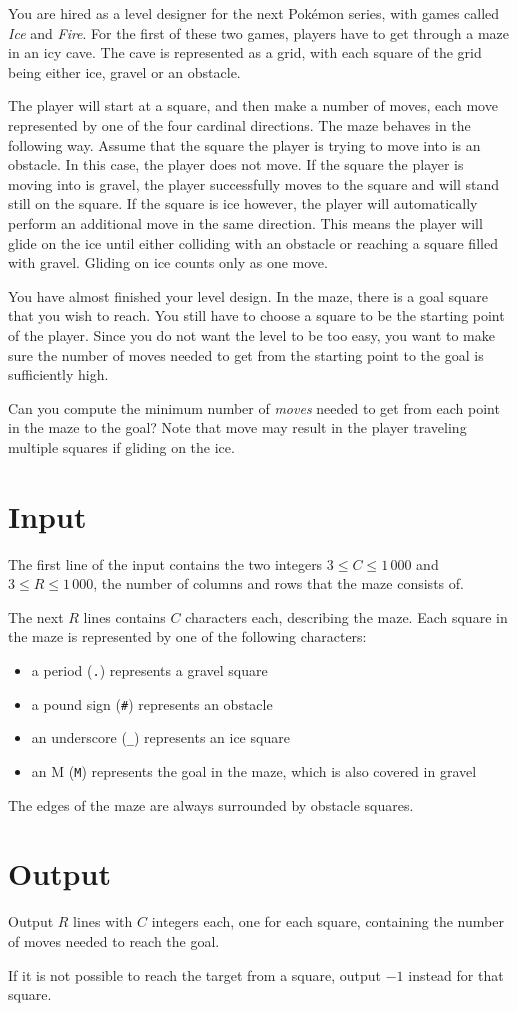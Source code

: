 You are hired as a level designer for the next Pokémon series, with games called \emph{Ice} and \emph{Fire}.
For the first of these two games, players have to get through a maze in an icy cave.
The cave is represented as a grid, with each square of the grid being either ice, gravel or an obstacle.

The player will start at a square, and then make a number of moves, each move represented by one of the four cardinal directions.
The maze behaves in the following way.
Assume that the square the player is trying to move into is an obstacle.
In this case, the player does not move.
If the square the player is moving into is gravel, the player successfully moves to the square and will stand still on the square.
If the square is ice however, the player will automatically perform an additional move in the same direction.
This means the player will glide on the ice until either colliding with an obstacle or reaching a square filled with gravel.
Gliding on ice counts only as one move.

You have almost finished your level design.
In the maze, there is a goal square that you wish to reach.
You still have to choose a square to be the starting point of the player.
Since you do not want the level to be too easy, you want to make sure the number of moves needed to get from the starting point to the goal is sufficiently high.

Can you compute the minimum number of \emph{moves} needed to get from each point in the maze to the goal?
Note that move may result in the player traveling multiple squares if gliding on the ice.

\section*{Input}
The first line of the input contains the two integers $3 \le C \le 1\,000$ and $3 \le R \le 1\,000$, the number of columns and rows that the maze consists of.

The next $R$ lines contains $C$ characters each, describing the maze.
Each square in the maze is represented by one of the following characters:
\begin{itemize}
\item a period (\texttt{.}) represents a gravel square
\item a pound sign (\texttt{\#}) represents an obstacle
\item an underscore (\texttt{\_}) represents an ice square
\item an M (\texttt{M}) represents the goal in the maze, which is also covered in gravel
\end{itemize}

The edges of the maze are always surrounded by obstacle squares.

\section*{Output}
Output $R$ lines with $C$ integers each, one for each square, containing the number of moves needed to reach the goal.

If it is not possible to reach the target from a square, output $-1$ instead for that square.
